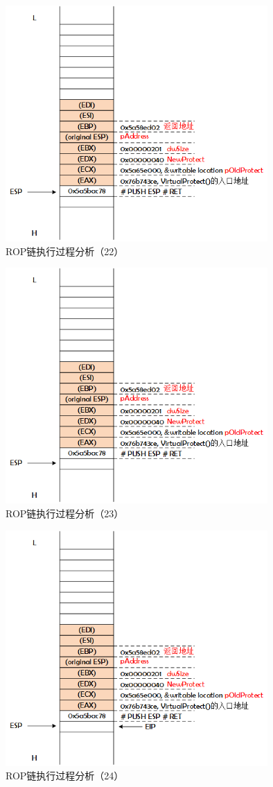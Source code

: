 \documentclass[bachelor]{thesis-uestc}
\begin{document}
\begin{figure}[htbp]
	\centering\includegraphics[height=9cm]{images/rop_chain_s22.png}
	\caption{ROP链执行过程分析（22）}
	\label{fig:rop_chain_s22}
\end{figure}

\begin{figure}[htbp]
	\centering\includegraphics[height=9cm]{images/rop_chain_s23.png}
	\caption{ROP链执行过程分析（23）}
	\label{fig:rop_chain_s23}
\end{figure}

\begin{figure}[htbp]
	\centering\includegraphics[height=9cm]{images/rop_chain_s24.png}
	\caption{ROP链执行过程分析（24）}
	\label{fig:rop_chain_s24}
\end{figure}
\end{document}
